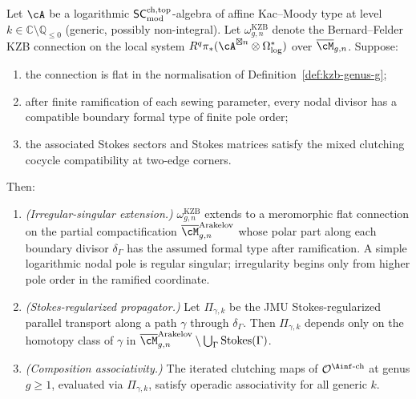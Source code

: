 \begin{theorem}
\label{thm:irregular-kzb-composition}
Let $\cA$ be a logarithmic $\mathsf{SC}^{\mathrm{ch,top}}_{\mathrm{mod}}$-algebra of affine Kac--Moody
type at level $k \in \mathbb{C} \setminus \mathbb{Q}_{\le 0}$
(generic, possibly non-integral). Let $\omega_{g,n}^{\mathrm{KZB}}$
denote the Bernard--Felder KZB connection on the local system
$R^q\pi_*(\cA^{\boxtimes n} \otimes \Omega^*_{\log})$ over
$\overline{\cM}_{g,n}$. Suppose:
\begin{enumerate}[label=\textup{(K\arabic*)}]
\item the connection is flat in the normalisation of
Definition~\ref{def:kzb-genus-g};
\item after finite ramification of each sewing parameter, every
nodal divisor has a compatible boundary formal type of finite pole
order;
\item the associated Stokes sectors and Stokes matrices satisfy the
mixed clutching cocycle compatibility at two-edge corners.
\end{enumerate}
Then:
\begin{enumerate}[label=\textup{(\roman*)}]
\item \emph{(Irregular-singular extension.)}
 $\omega_{g,n}^{\mathrm{KZB}}$ extends to a meromorphic flat
 connection on the partial compactification
 $\overline{\cM}_{g,n}^{\mathrm{Arakelov}}$ whose polar part along
 each boundary divisor $\delta_\Gamma$ has the assumed formal type
 after ramification. A simple logarithmic nodal pole is regular
 singular; irregularity begins only from higher pole order in the
 ramified coordinate.
\item \emph{(Stokes-regularized propagator.)}
 Let $\Pi_{\gamma,k}$ be the JMU Stokes-regularized parallel
 transport along a path $\gamma$ through $\delta_\Gamma$. Then
 $\Pi_{\gamma,k}$ depends only on the homotopy class of $\gamma$
 in $\overline{\cM}_{g,n}^{\mathrm{Arakelov}} \setminus
 \bigcup_\Gamma \mathrm{Stokes}(\Gamma)$.
\item \emph{(Composition associativity.)}
 The iterated clutching maps of $\mathcal{O}^{\Ainf\text{-ch}}$
 at genus $g \ge 1$, evaluated via $\Pi_{\gamma,k}$, satisfy
 operadic associativity for all generic $k$.
\end{enumerate}
\end{theorem}


